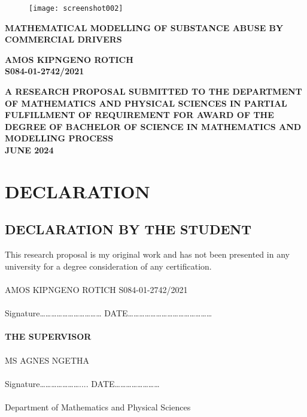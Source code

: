 \documentclass[12pt]{report}
\begin{document}
\begin{figure}
	\centering
	\texttt{[image: screenshot002]}

	\label{fig:screenshot002}
\end{figure}


	
	\begin{titlepage}
		\begin{center}
			\vspace*{1cm}
			
			
			\textbf{MATHEMATICAL MODELLING OF SUBSTANCE ABUSE BY COMMERCIAL DRIVERS}
			
			\vspace{2cm}
			
			
			\textbf{AMOS KIPNGENO ROTICH} \\
			\textbf{S084-01-2742/2021}
			
		\vspace{2cm}
			

			\textbf{A RESEARCH PROPOSAL SUBMITTED TO THE DEPARTMENT OF
			MATHEMATICS AND PHYSICAL SCIENCES IN PARTIAL FULFILLMENT OF 
			REQUIREMENT FOR AWARD OF THE DEGREE OF BACHELOR OF SCIENCE IN MATHEMATICS AND MODELLING PROCESS}\\
			\vspace{6cm}
			\textbf{JUNE 2024}
				\end{center}
		
		\newpage
		
		
		
		\thispagestyle{empty}
	\end{titlepage}
\newpage

\section*{DECLARATION}
\subsection*{DECLARATION BY THE STUDENT}
This research proposal is my original work and has not been presented in any university for a degree consideration of any certification. \\\\
AMOS KIPNGENO ROTICH \hspace*{1.7cm}
S084-01-2742/2021 \\\\
Signature…………………………… DATE………………………………………\\\\
\textbf{THE SUPERVISOR}\\
\\
MS AGNES NGETHA \\\\
Signature………………….... DATE…………………… \\\\
Department of Mathematics and Physical Sciences
		
\end{document}

